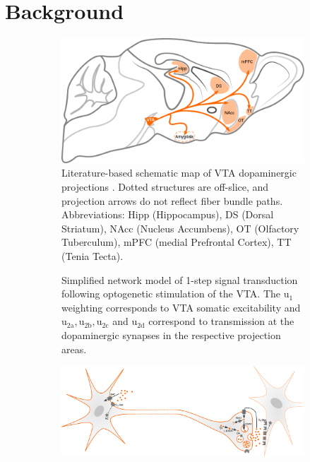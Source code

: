 \section{Background}

\begin{sansmath}
\begin{figure}[h!]
	\centering
	\hspace*{\fill}
	\begin{subfigure}{.527\textwidth}
		\centering
		\includegraphics[width=\textwidth]{img/model_literature}
		\caption{
			Literature-based schematic map of VTA dopaminergic projections \cite{Aransay2015,Fields2007,Ikemoto2007,Hnasko2012,Pan2010}.
			Dotted structures are off-slice, and projection arrows do not reflect fiber bundle paths.
			Abbreviations: Hipp (Hippocampus), DS (Dorsal Striatum), NAcc (Nucleus Accumbens), OT (Olfactory Tuberculum), mPFC (medial Prefrontal Cortex), TT (Tenia Tecta).
			}
		\label{fig:ml}
	\end{subfigure}\hfill
	\begin{subfigure}{.44\textwidth}
		\centering
		\vspace{-1em}
		\vspace{-0.6em}
		\caption{
			Simplified network model of 1-step signal transduction following optogenetic stimulation of the VTA.
			The $\mathrm{u_1}$ weighting corresponds to VTA somatic excitability and $\mathrm{u_{2a},u_{2b},u_{2c}}$ and $\mathrm{u_{2d}}$ correspond to transmission at the dopaminergic synapses in the respective projection areas.
			}
		\label{fig:md}
	\end{subfigure}
	\hspace*{\fill}
	\begin{subfigure}{.985\textwidth}
		\centering
		\includegraphics[width=\textwidth]{img/da}

\end{subfigure}
\end{figure}
\end{sansmath}
